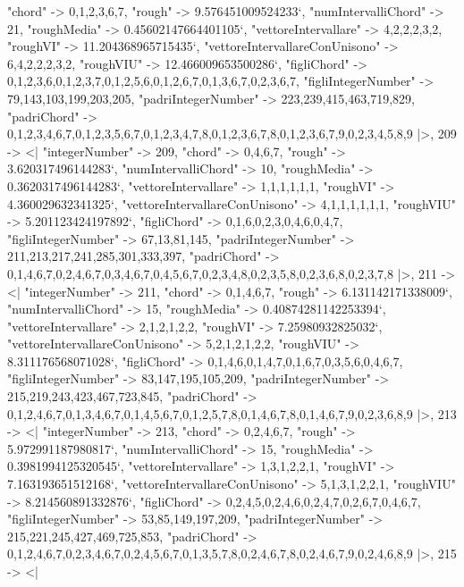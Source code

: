\documentclass[
]{article}
\begin{document}
\begin{DatasetVerbatim}
    "chord" -> {0,1,2,3,6,7},
    "rough" -> 9.576451009524233`,
    "numIntervalliChord" -> 21,
    "roughMedia" -> 0.45602147664401105`,
    "vettoreIntervallare" -> {4,2,2,2,3,2},
    "roughVI" -> 11.204368965715435`,
    "vettoreIntervallareConUnisono" -> {6,4,2,2,2,3,2},
    "roughVIU" -> 12.466009653500286`,
    "figliChord" -> {{0,1,2,3,6},{0,1,2,3,7},{0,1,2,5,6},{0,1,2,6,7},{0,1,3,6,7},{0,2,3,6,7}},
    "figliIntegerNumber" -> {79,143,103,199,203,205},
    "padriIntegerNumber" -> {223,239,415,463,719,829},
    "padriChord" -> {{0,1,2,3,4,6,7},{0,1,2,3,5,6,7},{0,1,2,3,4,7,8},{0,1,2,3,6,7,8},{0,1,2,3,6,7,9},{0,2,3,4,5,8,9}}
  |>,
  209 -> <|
    "integerNumber" -> 209,
    "chord" -> {0,4,6,7},
    "rough" -> 3.620317496144283`,
    "numIntervalliChord" -> 10,
    "roughMedia" -> 0.3620317496144283`,
    "vettoreIntervallare" -> {1,1,1,1,1,1},
    "roughVI" -> 4.360029632341325`,
    "vettoreIntervallareConUnisono" -> {4,1,1,1,1,1,1},
    "roughVIU" -> 5.201123424197892`,
    "figliChord" -> {{0,1,6},{0,2,3},{0,4,6},{0,4,7}},
    "figliIntegerNumber" -> {67,13,81,145},
    "padriIntegerNumber" -> {211,213,217,241,285,301,333,397},
    "padriChord" -> {{0,1,4,6,7},{0,2,4,6,7},{0,3,4,6,7},{0,4,5,6,7},{0,2,3,4,8},{0,2,3,5,8},{0,2,3,6,8},{0,2,3,7,8}}
  |>,
  211 -> <|
    "integerNumber" -> 211,
    "chord" -> {0,1,4,6,7},
    "rough" -> 6.131142171338009`,
    "numIntervalliChord" -> 15,
    "roughMedia" -> 0.40874281142253394`,
    "vettoreIntervallare" -> {2,1,2,1,2,2},
    "roughVI" -> 7.25980932825032`,
    "vettoreIntervallareConUnisono" -> {5,2,1,2,1,2,2},
    "roughVIU" -> 8.311176568071028`,
    "figliChord" -> {{0,1,4,6},{0,1,4,7},{0,1,6,7},{0,3,5,6},{0,4,6,7}},
    "figliIntegerNumber" -> {83,147,195,105,209},
    "padriIntegerNumber" -> {215,219,243,423,467,723,845},
    "padriChord" -> {{0,1,2,4,6,7},{0,1,3,4,6,7},{0,1,4,5,6,7},{0,1,2,5,7,8},{0,1,4,6,7,8},{0,1,4,6,7,9},{0,2,3,6,8,9}}
  |>,
  213 -> <|
    "integerNumber" -> 213,
    "chord" -> {0,2,4,6,7},
    "rough" -> 5.972991187980817`,
    "numIntervalliChord" -> 15,
    "roughMedia" -> 0.3981994125320545`,
    "vettoreIntervallare" -> {1,3,1,2,2,1},
    "roughVI" -> 7.163193651512168`,
    "vettoreIntervallareConUnisono" -> {5,1,3,1,2,2,1},
    "roughVIU" -> 8.214560891332876`,
    "figliChord" -> {{0,2,4,5},{0,2,4,6},{0,2,4,7},{0,2,6,7},{0,4,6,7}},
    "figliIntegerNumber" -> {53,85,149,197,209},
    "padriIntegerNumber" -> {215,221,245,427,469,725,853},
    "padriChord" -> {{0,1,2,4,6,7},{0,2,3,4,6,7},{0,2,4,5,6,7},{0,1,3,5,7,8},{0,2,4,6,7,8},{0,2,4,6,7,9},{0,2,4,6,8,9}}
  |>,
  215 -> <|

\end{DatasetVerbatim}
\end{document}
